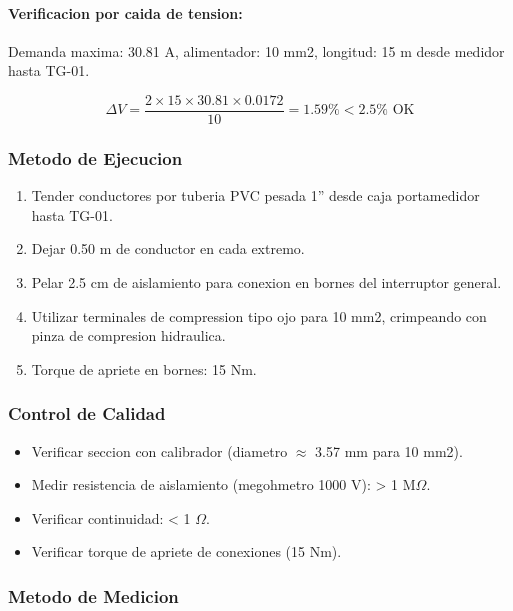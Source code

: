 \paragraph{Verificacion por caida de tension:}
Demanda maxima: 30.81 A, alimentador: 10 mm2, longitud: 15 m desde medidor hasta TG-01.

\begin{equation}
\Delta V = \frac{2 \times 15 \times 30.81 \times 0.0172}{10} = 1.59\% < 2.5\% \text{ OK}
\end{equation}

\subsubsection{Metodo de Ejecucion}

\begin{enumerate}
  \item Tender conductores por tuberia PVC pesada 1'' desde caja portamedidor hasta TG-01.
  \item Dejar 0.50 m de conductor en cada extremo.
  \item Pelar 2.5 cm de aislamiento para conexion en bornes del interruptor general.
  \item Utilizar terminales de compression tipo ojo para 10 mm2, crimpeando con pinza de compresion hidraulica.
  \item Torque de apriete en bornes: 15 Nm.
\end{enumerate}

\subsubsection{Control de Calidad}

\begin{itemize}
  \item Verificar seccion con calibrador (diametro $\approx$ 3.57 mm para 10 mm2).
  \item Medir resistencia de aislamiento (megohmetro 1000 V): > 1 M$\Omega$.
  \item Verificar continuidad: < 1 $\Omega$.
  \item Verificar torque de apriete de conexiones (15 Nm).
\end{itemize}

\subsubsection{Metodo de Medicion}


